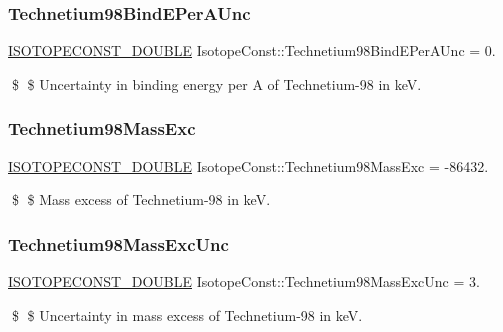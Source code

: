 \subsubsection{\texorpdfstring{Technetium98\+Bind\+E\+Per\+A\+Unc}{Technetium98BindEPerAUnc}}
{\footnotesize\ttfamily \mbox{\hyperlink{group___isotope_const-_macros_ga8f45a7272ce02c0b4c65c44636ed719a}{I\+S\+O\+T\+O\+P\+E\+C\+O\+N\+S\+T\+\_\+\+D\+O\+U\+B\+LE}} Isotope\+Const\+::\+Technetium98\+Bind\+E\+Per\+A\+Unc = 0.}

\$ \$ Uncertainty in binding energy per A of Technetium-\/98 in keV. \mbox{\label{group___isotope_const-_technetium-_tc98_gab0e89145c01f3d018b683f307170c38c}} 
\subsubsection{\texorpdfstring{Technetium98\+Mass\+Exc}{Technetium98MassExc}}
{\footnotesize\ttfamily \mbox{\hyperlink{group___isotope_const-_macros_ga8f45a7272ce02c0b4c65c44636ed719a}{I\+S\+O\+T\+O\+P\+E\+C\+O\+N\+S\+T\+\_\+\+D\+O\+U\+B\+LE}} Isotope\+Const\+::\+Technetium98\+Mass\+Exc = -\/86432.}

\$ \$ Mass excess of Technetium-\/98 in keV. \mbox{\label{group___isotope_const-_technetium-_tc98_ga31ee4ceca93c724f575167cbc897ae62}} 
\subsubsection{\texorpdfstring{Technetium98\+Mass\+Exc\+Unc}{Technetium98MassExcUnc}}
{\footnotesize\ttfamily \mbox{\hyperlink{group___isotope_const-_macros_ga8f45a7272ce02c0b4c65c44636ed719a}{I\+S\+O\+T\+O\+P\+E\+C\+O\+N\+S\+T\+\_\+\+D\+O\+U\+B\+LE}} Isotope\+Const\+::\+Technetium98\+Mass\+Exc\+Unc = 3.}

\$ \$ Uncertainty in mass excess of Technetium-\/98 in keV. \mbox{\label{group___isotope_const-_technetium-_tc98_ga94c7857f27377e9988ee36a4a208ccd2}} 
